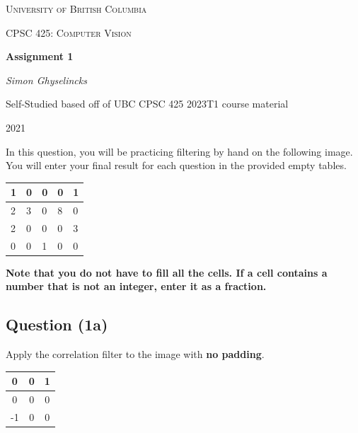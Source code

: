 \documentclass[12pt]{article}
\begin{document}
\begin{titlepage}
  \centering
  
  {\scshape\LARGE University of British Columbia \par}
  \vspace{1cm}
  {\scshape\Large CPSC 425: Computer Vision\par}
  \vspace{1.5cm}
  {\huge\bfseries Assignment 1\par}
  \vspace{2cm}
  {\Large\itshape Simon Ghyselincks\par}
  \vfill
  Self-Studied based off of UBC CPSC 425 2023T1 course material\par

  \vfill

  {\large 2021\par}
\end{titlepage}





\noindent In this question, you will be practicing filtering by hand on the following image. You will enter your final result for each question in the provided empty tables.

\begin{center}
\begin{tabular}{|l|l|l|l|l|}
\hline
1 & 0 & 0 & 0 & 1 \\ \hline
2 & 3 & 0 & 8 & 0 \\ \hline
2 & 0 & 0 & 0 & 3 \\ \hline
0 & 0 & 1 & 0 & 0 \\ \hline
\end{tabular}
\end{center}
\textbf{Note that you do not have to fill all the cells. If a cell contains a number that is not an integer, enter it as a fraction.}

\subsection*{Question (1a)} Apply the correlation filter to the image with \textbf{no padding}.
\begin{center}
\begin{tabular}{|c|c|c|}
\hline
0  & 0 & 1 \\ \hline
0  & 0 & 0 \\ \hline
-1 & 0 & 0 \\ \hline
\end{tabular}
\end{center}
\end{document}

